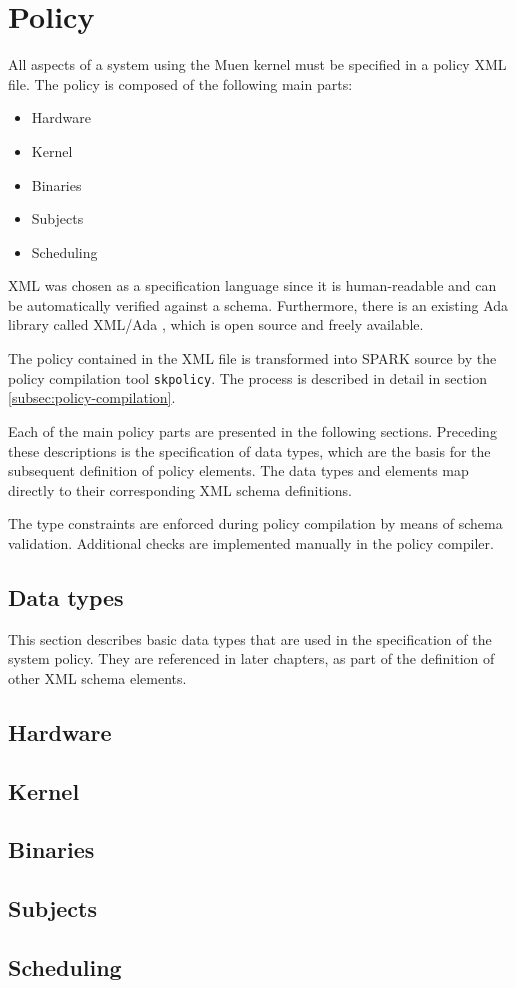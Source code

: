 \section{Policy}\label{sec:policy}
All aspects of a system using the Muen kernel must be specified in a policy XML
file. The policy is composed of the following main parts:

\begin{itemize}
	\item Hardware
	\item Kernel
	\item Binaries
	\item Subjects
	\item Scheduling
\end{itemize}

XML was chosen as a specification language since it is human-readable and can
be automatically verified against a schema. Furthermore, there is an existing
Ada library called XML/Ada \cite{xmlada}, which is open source and freely
available.

The policy contained in the XML file is transformed into SPARK source by the
policy compilation tool \texttt{skpolicy}. The process is described in detail in
section \ref{subsec:policy-compilation}.

Each of the main policy parts are presented in the following sections. Preceding
these descriptions is the specification of data types, which are the basis for
the subsequent definition of policy elements. The data types and elements map
directly to their corresponding XML schema definitions.

The type constraints are enforced during policy compilation by means of schema
validation. Additional checks are implemented manually in the policy compiler.

\subsection{Data types}
This section describes basic data types that are used in the specification of
the system policy. They are referenced in later chapters, as part of the
definition of other XML schema elements.



\subsection{Hardware}
\label{subsec:hardware}


\subsection{Kernel}


\subsection{Binaries}


\subsection{Subjects}\label{subsec:subjects}


\subsection{Scheduling}

